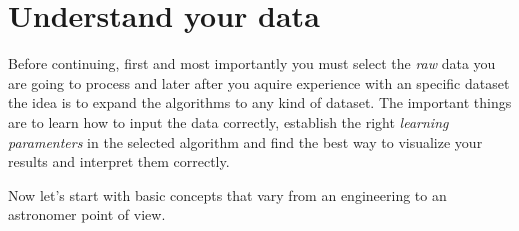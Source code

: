 \documentclass[11pt,fleqn]{book} %
\begin{document}

																																																																																																																																																																\chapter{Understand your data}

																																																																																																																																																																Before continuing, first and most importantly you must select the \emph{raw} data you are going to process and later after you aquire experience with an specific dataset the idea is to expand the algorithms to any kind of dataset. The important things are to learn how to input the data correctly, establish the right \emph{learning paramenters} in the selected algorithm and find the best way to visualize your results and interpret them correctly.

																																																																																																																																																																Now let's start with basic concepts that vary from an engineering to an astronomer point of view.
\end{document}
